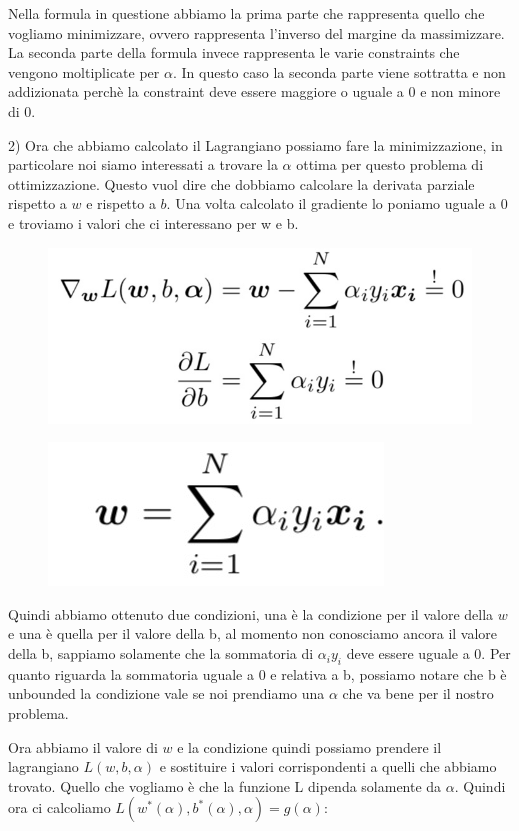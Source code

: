 \documentclass[14pt]{extreport}
\begin{document}
Nella formula in questione abbiamo la prima parte che rappresenta quello che vogliamo minimizzare, ovvero rappresenta l'inverso del margine da
massimizzare. La seconda parte della formula invece rappresenta le varie constraints che vengono moltiplicate per $\alpha$. In questo caso la seconda
parte viene sottratta e non addizionata perchè la constraint deve essere maggiore o uguale a 0 e non minore di 0.

2) Ora che abbiamo calcolato il Lagrangiano possiamo fare la minimizzazione, in particolare noi siamo interessati a trovare la $\alpha$ ottima per
questo problema di ottimizzazione. Questo vuol dire che dobbiamo calcolare la derivata parziale rispetto a $w$ e rispetto a $b$. Una volta calcolato
il gradiente lo poniamo uguale a 0 e troviamo i valori che ci interessano per w e b.

\begin{figure}[H]
	\centering
	\includegraphics[width=0.4\linewidth]{316.jpeg}
\end{figure}

\begin{figure}[H]
	\centering
	\includegraphics[width=0.3\linewidth]{317.jpeg}
\end{figure}

Quindi abbiamo ottenuto due condizioni, una è la condizione per il valore della $w$ e una è quella per il valore della b, al momento non conosciamo
ancora il valore della b, sappiamo solamente che la sommatoria di $\alpha_iy_i$ deve essere uguale a 0. Per quanto riguarda la sommatoria uguale a 0 e
relativa a b, possiamo notare che b è unbounded la condizione vale se noi prendiamo una $\alpha$ che va bene per il nostro problema.

Ora abbiamo il valore di $w$ e la condizione quindi possiamo prendere il lagrangiano $L(w,b,\alpha)$ e sostituire i valori corrispondenti a quelli che
abbiamo trovato. Quello che vogliamo è che la funzione L dipenda solamente da $\alpha$. Quindi ora ci calcoliamo $L(w^{*}(\alpha), b^{*}(\alpha),
\alpha) = g(\alpha)$:
\end{document}
